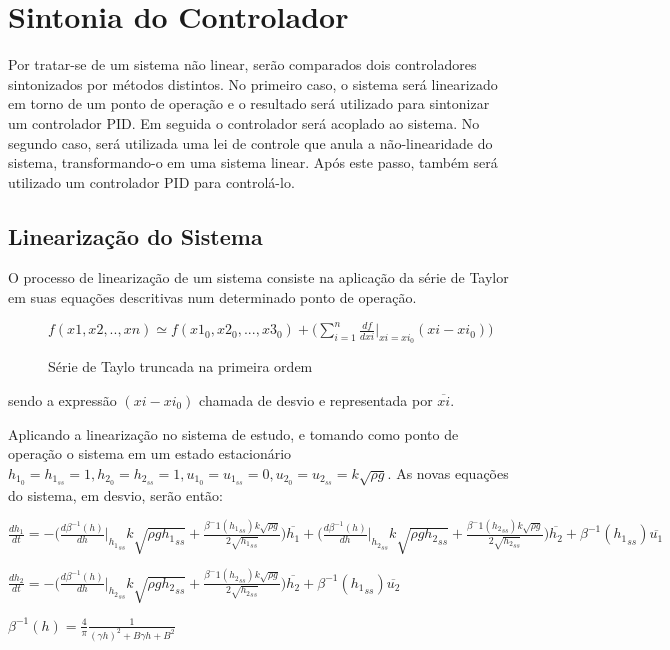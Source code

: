\section{Sintonia do Controlador}

Por tratar-se de um sistema não linear, serão comparados dois controladores sintonizados por métodos distintos. No primeiro caso, o sistema será linearizado em torno de um ponto de operação e o resultado será utilizado para sintonizar um controlador PID. Em seguida o controlador será acoplado ao sistema. No segundo caso, será utilizada uma lei de controle que anula a não-linearidade do sistema, transformando-o em uma sistema linear. Após este passo, também será utilizado um controlador PID para controlá-lo.

\subsection{Linearização do Sistema}

O processo de linearização de um sistema consiste na aplicação da série de Taylor em suas equações descritivas num determinado ponto de operação.

\begin{figure}
	\centering
	$
	f(x1, x2, .. , xn) \simeq f(x1_0, x2_0, ..., x3_0) + \bigg( \sum_{i=1}^n \frac{df}{dxi}\big|_{xi=xi_0} (xi - xi_0) \bigg)
	$
	\caption{Série de Taylo truncada na primeira ordem}
\end{figure}

sendo a expressão $(xi - xi_0)$ chamada de desvio e representada por $\overline{xi}$.

Aplicando a linearização no sistema de estudo, e tomando como ponto de operação o sistema em um estado estacionário $h_{1_0}=h_{1_{ss}}=1, h_{2_0}=h_{2_{ss}}=1, u_{1_0}=u_{1_{ss}}=0, u_{2_0}=u_{2_{ss}}=k\sqrt{\rho g}$. As novas equações do sistema, em desvio, serão então:

$
\frac{dh_1}{dt} = -\big(\frac{d\beta^{-1}(h)}{dh}\bigg|_{{h_1}_{ss}} k\sqrt{\rho g {h_1}_{ss}} + \frac{\beta^-1({h_1}_{ss}) k\sqrt{\rho g}}{2\sqrt{{h_1}_{ss}}}\big)\overline{h_1} + \big(\frac{d\beta^{-1}(h)}{dh}\bigg|_{{h_2}_{ss}} k\sqrt{\rho g {h_2}_{ss}} + \frac{\beta^-1({h_2}_{ss}) k\sqrt{\rho g}}{2\sqrt{{h_2}_{ss}}}\big)\overline{h_2} +  \beta^{-1}({h_1}_{ss})\overline{u_1}
$

$
\frac{dh_2}{dt} = -\big(\frac{d\beta^{-1}(h)}{dh}\bigg|_{{h_2}_{ss}} k\sqrt{\rho g {h_2}_{ss}} + \frac{\beta^-1({h_2}_{ss}) k\sqrt{\rho g}}{2\sqrt{{h_2}_{ss}}}\big)\overline{h_2} + \beta^{-1}({h_1}_{ss})\overline{u_2}
$

$
\beta^{-1}(h) = \frac{4}{\pi}\frac{1}{(\gamma h)^2 + B\gamma h + B^2} 
$